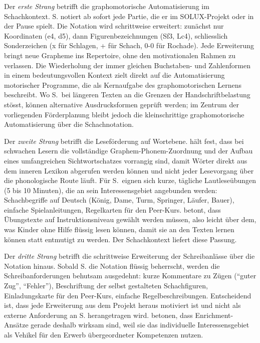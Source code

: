 \documentclass[ngerman, a4paper]{article}
\begin{document}
Der \textit{erste Strang} betrifft die graphomotorische Automatisierung im
Schachkontext. S. notiert ab sofort jede Partie, die er im SOLUX-Projekt oder
in der Pause spielt. Die Notation wird schrittweise erweitert: zunächst nur
Koordinaten (e4, d5), dann Figurenbezeichnungen (Sf3, Lc4), schliesslich
Sonderzeichen (x für Schlagen, + für Schach, 0-0 für Rochade). Jede Erweiterung
bringt neue Grapheme ins Repertoire, ohne den motivationalen Rahmen zu verlassen.
Die Wiederholung der immer gleichen Buchstaben- und Zahlenformen in einem
bedeutungsvollen Kontext zielt direkt auf die Automatisierung motorischer
Programme, die \textcite[S.\,128--132]{nottbusch2017graphomotorik} als
Kernaufgabe des graphomotorischen Lernens beschreibt.
Wo S.\ bei längeren Texten an die Grenzen
der Handschriftbelastung stösst, können alternative Ausdrucksformen geprüft
werden; im Zentrum der vorliegenden Förderplanung bleibt jedoch die
kleinschrittige graphomotorische Automatisierung über die Schachnotation.

Der \textit{zweite Strang} betrifft die Leseförderung auf Wortebene.
\textcite[S.\,62]{gold2018lesenkannmanlernen} hält fest, dass bei schwachen
Lesern die vollständige Graphem-Phonem-Zuordnung und der Aufbau eines
umfangreichen Sichtwortschatzes vorrangig sind, damit Wörter direkt aus dem
inneren Lexikon abgerufen werden können und nicht jeder Lesevorgang über die
phonologische Route läuft.
Für S.\ eignen sich kurze, tägliche Lautleseübungen (5 bis 10 Minuten), die an
sein Interessensgebiet angebunden werden: Schachbegriffe auf Deutsch (König,
Dame, Turm, Springer, Läufer, Bauer), einfache Spielanleitungen, Regelkarten
für den Peer-Kurs. \textcite[S.\,70]{gold2018lesenkannmanlernen} betont, dass
Übungstexte auf Instruktionsniveau gewählt werden müssen, also leicht über
dem, was Kinder ohne Hilfe flüssig lesen können, damit sie an den Texten lernen
können statt entmutigt zu werden. Der Schachkontext liefert diese Passung.

Der \textit{dritte Strang} betrifft die schrittweise Erweiterung der
Schreibanlässe über die Notation hinaus. Sobald S. die Notation flüssig beherrscht,
werden die Schreibanforderungen behutsam ausgedehnt: kurze Kommentare zu
Zügen (\enquote{guter Zug}, \enquote{Fehler}), Beschriftung der selbst gestalteten
Schachfiguren, Einladungskarte für den Peer-Kurs, einfache Regelbeschreibungen.
Entscheidend ist, dass jede Erweiterung aus dem Projekt heraus motiviert ist
und nicht als externe Anforderung an S. herangetragen wird.
\textcite[S.\,254--273]{fischer2020begabungsfoerderung}
betonen, dass Enrichment-Ansätze gerade deshalb wirksam sind, weil sie das
individuelle Interessensgebiet als Vehikel für den Erwerb übergeordneter
Kompetenzen nutzen.
\end{document}
